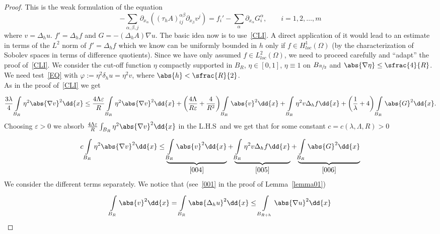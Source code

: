 \begin{proof}
	This is the weak formulation of the equation
	\[ - \sum\limits_{\alpha ,\beta ,j}^{} \partial_{x_{\alpha}} \left( {(\tau _{h}A)}_{ij}^{\alpha \beta } \partial_{x_{\beta }} v^{j} \right)= f_{i}' - \sum\limits_{\alpha }^{} \partial_{x_{\alpha }} G_{i}^{\alpha }, \qquad i=1,2,\ldots,m \tag{EQ} \label{EQ} \]
	where \( v= \Delta _{h}u \). \( f'=\Delta _{h}f \) and \( G=-(\Delta _{h}A) \nabla u \). The basic idea now is to use~\eqref{CLI}. A direct application of it would lead to an estimate in terms of the \( L^{2} \) norm of \( f'=\Delta _{h}f \) which we know can be uniformly bounded in \( h \) only if \( f \in H_{loc}^{1}(\Omega )  \) (by the characterization of Sobolev spaces in terms of difference quotients). Since we have only assumed \( f \in L_{loc}^{2}(\Omega) \), we need to proceed carefully and \enquote{adapt} the proof of~\eqref{CLI}. We consider the cut-off function \( \eta \) compactly supported in \( B_{R} \), \( \eta \in [0,1]  \), \( \eta \equiv 1 \) on \( B_{\sfrac{R}{2}} \) and \( \abs{\nabla \eta }\leq \sfrac{4}{R} \). We need test~\eqref{EQ} with \( \varphi := \eta ^{2}\delta _{h}u= \eta ^{2}v \), where \( \abs{h}<\sfrac{R}{2} \). \\
	As in the proof of~\eqref{CLI} we get
	\[ \frac{3 \lambda }{4}\int\limits_{B_{R}}^{} \eta ^{2}\abs{\nabla v}^{2} \dd{x} \leq  \frac{4 \Lambda \varepsilon }{R}\int\limits_{B_{R}}^{} \eta ^{2}\abs{\nabla v}^{2} \dd{x}+ \left( \frac{4 \Lambda }{R \varepsilon }+ \frac{4}{R^{2}}\right) \int\limits_{B_{R}}^{} \abs{v}^{2} \dd{x}	+ \int\limits_{B_{R}}^{} \eta ^{2}v \Delta _{h}f \dd{x} + \left( \frac{1}{\lambda } + 4	 \right) \int\limits_{B_{R}}^{} \abs{G}^{2} \dd{x}. \]
	Choosing \( \varepsilon > 0 \) we absorb \( \frac{4 \Lambda \varepsilon }{R} \int_{B_{R}}^{} \eta ^{2} \abs{\nabla v}^{2} \dd{x} \) in the L.H.S\ and we get that for some constant \( c=c(\lambda , \Lambda , R) > 0 \)
	\begin{gather}
		c \int\limits_{B_{R}}^{} \eta ^{2}\abs{\nabla v}^{2} \dd{x} \leq \underbrace{\int\limits_{B_{R}}^{} \abs{v}^{2} \dd{x}}_{\eqref{004}} + \underbrace{\int\limits_{B_{R}}^{} \eta ^{2} v \Delta _{h}f \dd{x}}_{\eqref{005} } + \underbrace{\int\limits_{B_{R}}^{} \abs{G}^{2} \dd{x}}_{\eqref{006}} \label{003}
	\end{gather}
	We consider the different terms separately. We notice that (see~\eqref{001} in the proof of Lemma~\ref{lemma01})
	\begin{gather}
		\int\limits_{B_{R}}^{} \abs{v}^{2} \dd{x} = \int\limits_{B_{R}}^{} \abs{\Delta _{h} u}^{2} \dd{x} \leq \int\limits_{B_{R+h}}^{} \abs{\nabla u}^{2} \dd{x} \label{004}

\end{gather}
\end{proof}

